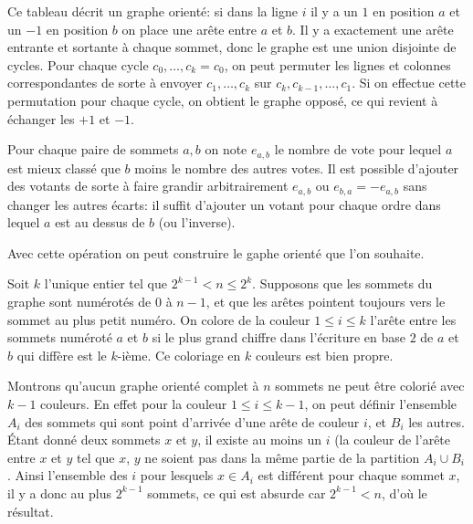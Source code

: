 \begin{sol}
Ce tableau décrit un graphe orienté: si dans la ligne $i$ il y a un $1$ en position $a$ et un $-1$ en position $b$ on place une arête entre $a$ et $b$. Il y a exactement une arête entrante et sortante à chaque sommet, donc le graphe est une union disjointe de cycles. Pour chaque cycle $c_0, \dots, c_k = c_0$, on peut permuter les lignes et colonnes correspondantes de sorte à envoyer $c_1, \dots, c_k$ sur $c_k, c_{k - 1}, \dots, c_1$. Si on effectue cette permutation pour chaque cycle, on obtient le graphe opposé, ce qui revient à échanger les $+1$ et $-1$.
\end{sol}


\begin{sol}
Pour chaque paire de sommets $a,b$ on note $e_{a,b}$ le nombre de vote pour lequel $a$ est mieux classé que $b$ moins le nombre des autres votes. Il est possible d'ajouter des votants de sorte à faire grandir arbitrairement $e_{a,b}$ ou $e_{b,a}=-e_{a,b}$ sans changer les autres écarts: il suffit d'ajouter un votant pour chaque ordre dans lequel $a$ est au dessus de $b$ (ou l'inverse).

\medskip

Avec cette opération on peut construire le gaphe orienté que l'on souhaite.
\end{sol}


\begin{sol}
Soit $k$ l'unique entier tel que $2^{k - 1} < n \le 2^k$. Supposons que les sommets du graphe sont numérotés de $0$ à $n - 1$, et que les arêtes pointent toujours vers le sommet au plus petit numéro. On colore de la couleur $1\le i\le k$ l'arête entre les sommets numéroté $a$ et $b$ si le plus grand chiffre dans l'écriture en base $2$ de $a$ et $b$ qui diffère est le $k$-ième. Ce coloriage en $k$ couleurs est bien propre.

\medskip

Montrons qu'aucun graphe orienté complet à $n$ sommets ne peut être colorié avec $k - 1$ couleurs. En effet pour la couleur $1 \le i \le k-1$, on peut définir l'ensemble $A_i$ des sommets qui sont point d'arrivée d'une arête de couleur $i$, et $B_i$ les autres. Étant donné deux sommets $x$ et $y$, il existe au moins un $i$ (la couleur de l'arête entre $x$ et $y$ tel que $x$, $y$ ne soient pas dans la même partie de la partition $A_i\cup B_i$. Ainsi l'ensemble des $i$ pour lesquels $x\in A_i$ est différent pour chaque sommet $x$, il y a donc au plus $2^{k - 1}$ sommets, ce qui est absurde car $2^{k - 1} < n$, d'où le résultat.
\end{sol}


